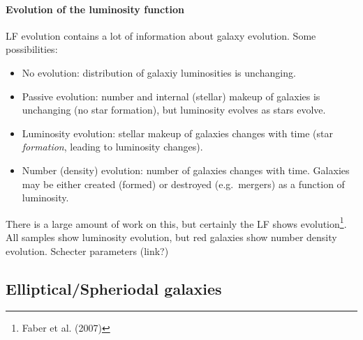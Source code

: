 \documentclass{article}
\newcommand{\mynotes}[1]{\textcolor{cadmiumgreen}{#1}}
\begin{document}
\paragraph{Evolution of the luminosity function}
LF evolution contains a lot of information about galaxy evolution.
Some possibilities:
\begin{itemize}
    \item No evolution: distribution of galaxiy luminosities is unchanging.
    \item Passive evolution: number and internal (stellar) makeup of
        galaxies is unchanging \mynotes{(no star formation)},
        but luminosity evolves as stars evolve.
    \item Luminosity evolution: stellar makeup of galaxies changes with
        time (star \emph{formation}, leading to luminosity changes).
    \item Number (density) evolution: number of galaxies changes with time.
        Galaxies may be either created (formed) or destroyed (e.g.\
        mergers) as a function of luminosity.
\end{itemize}
There is a large amount of work on this, but certainly the LF shows
evolution\footnote{Faber et al. (2007)}. All samples show luminosity
evolution, but red galaxies show number density evolution.
Schecter parameters (link?)


\subsection{Elliptical/Spheriodal galaxies}
\end{document}
